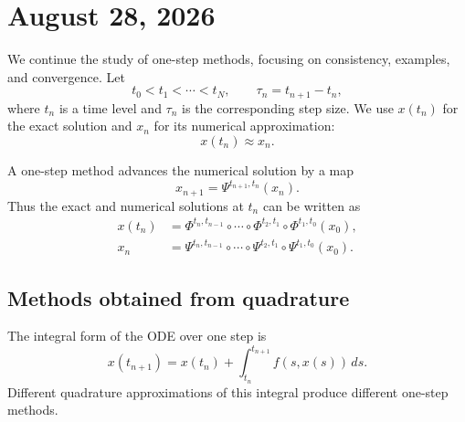 \section{August 28, 2026}

We continue the study of one-step methods, focusing on consistency,
examples, and convergence. Let
\[
  t_0<t_1<\cdots<t_N,
  \qquad
  \tau_n=t_{n+1}-t_n,
\]
where $t_n$ is a time level and $\tau_n$ is the corresponding step size.
We use $x(t_n)$ for the exact solution and $x_n$ for its numerical
approximation:
\[
  x(t_n)\approx x_n.
\]

\begin{center}
\end{center}

A one-step method advances the numerical solution by a map
\begin{equation}\label{eq:one-step-map-aug-28}
  x_{n+1}=\Psi^{t_{n+1},t_n}(x_n).
\end{equation}
Thus the exact and numerical solutions at $t_n$ can be written as
\begin{align*}
  x(t_n)
  &=\Phi^{t_n,t_{n-1}}\circ\cdots\circ
    \Phi^{t_2,t_1}\circ\Phi^{t_1,t_0}(x_0),\\
  x_n
  &=\Psi^{t_n,t_{n-1}}\circ\cdots\circ
    \Psi^{t_2,t_1}\circ\Psi^{t_1,t_0}(x_0).
\end{align*}

\subsection{Methods obtained from quadrature}

The integral form of the ODE over one step is
\begin{equation}\label{eq:one-step-integral-aug-28}
  x(t_{n+1})
  =x(t_n)+\int_{t_n}^{t_{n+1}}f(s,x(s))\,ds.
\end{equation}
Different quadrature approximations of this integral produce different
one-step methods.

